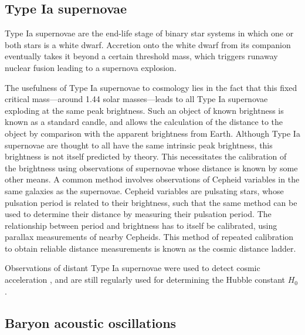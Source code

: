 \subsection{Type Ia supernovae}
\label{co_Sec:supernovae}

Type Ia supernovae are the end-life stage of binary star systems in which one or both stars is a white dwarf. Accretion onto the white dwarf from its companion eventually takes it beyond a certain threshold mass, which triggers runaway nuclear fusion leading to a supernova explosion.

The usefulness of Type Ia supernovae to cosmology lies in the fact that this fixed critical mass---around 1.44 solar masses---leads to all Type Ia supernovae exploding at the same peak brightness. Such an object of known brightness is known as a standard candle, and allows the calculation of the distance to the object by comparison with the apparent brightness from Earth. Although Type Ia supernovae are thought to all have the same intrinsic peak brightness, this brightness is not itself predicted by theory. This necessitates the calibration of the brightness using observations of supernovae whose distance is known by some other means. A common method involves observations of Cepheid variables in the same galaxies as the supernovae. Cepheid variables are pulsating stars, whose pulsation period is related to their brightness, such that the same method can be used to determine their distance by measuring their pulsation period. The relationship between period and brightness has to itself be calibrated, using parallax measurements of nearby Cepheids. This method of repeated calibration to obtain reliable distance measurements is known as the cosmic distance ladder.

Observations of distant Type Ia supernovae were used to detect cosmic acceleration \citep{Riess1998, Perlmutter1999}, and are still regularly used for determining the Hubble constant $H_0$ \citep{Dhawan2018, Burns2018, Macaulay2019, Taubenberger2019, Khetan2021, Riess2021a, Riess2021b}.

\subsection{Baryon acoustic oscillations}
\label{co_Sec:BAO}

